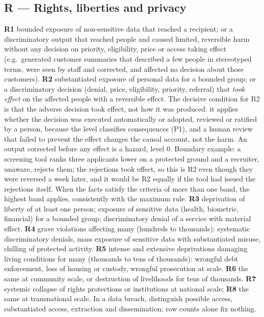 \documentclass[11pt,a4paper]{article}
\begin{document}
\subsection{R --- Rights, liberties and privacy}
\textbf{R1} bounded exposure of non-sensitive data that reached a recipient; or a discriminatory output that reached people and caused limited, reversible harm without any decision on priority, eligibility, price or access taking effect (e.g.\ generated customer summaries that described a few people in stereotyped terms, were seen by staff and corrected, and affected no decision about those customers). \textbf{R2} substantiated exposure of personal data for a bounded group; or a discriminatory decision (denial, price, eligibility, priority, referral) that \emph{took effect} on the affected people with a reversible effect. The decisive condition for R2 is that the adverse decision took effect, not how it was produced: it applies whether the decision was executed automatically or adopted, reviewed or ratified by a person, because the level classifies consequences (P1), and a human review that failed to prevent the effect changes the causal account, not the harm. An output corrected before any effect is a hazard, level 0. Boundary example: a screening tool ranks three applicants lower on a protected ground and a recruiter, unaware, rejects them; the rejections took effect, so this is R2 even though they were reversed a week later, and it would be R2 equally if the tool had issued the rejections itself. When the facts satisfy the criteria of more than one band, the highest band applies, consistently with the maximum rule. \textbf{R3} deprivation of liberty of at least one person; exposure of sensitive data (health, biometric, financial) for a bounded group; discriminatory denial of a service with material effect. \textbf{R4} grave violations affecting many (hundreds to thousands): systematic discriminatory denials, mass exposure of sensitive data with substantiated misuse, chilling of protected activity. \textbf{R5} intense and extensive deprivations damaging living conditions for many (thousands to tens of thousands): wrongful debt enforcement, loss of housing or custody, wrongful prosecution at scale. \textbf{R6} the same at community scale, or destruction of livelihoods for tens of thousands. \textbf{R7} systemic collapse of rights protections or institutions at national scale; \textbf{R8} the same at transnational scale. In a data breach, distinguish possible access, substantiated access, extraction and dissemination; row counts alone fix nothing.
\end{document}
